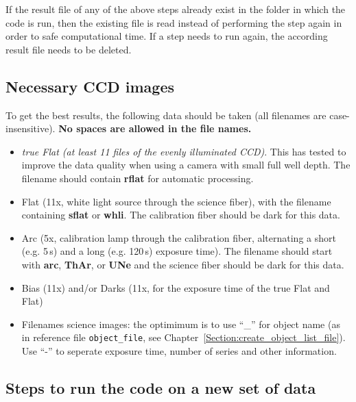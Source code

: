 \documentclass[10pt,a4paper]{article}
\begin{document}
\noindent If the result file of any of the above steps already exist in the folder in which the code is run, then the existing file is read instead of performing the step again in order to safe computational time. If a step needs to run again, the according result file needs to be deleted.

\subsection{Necessary CCD images}
To get the best results, the following data should be taken (all filenames are case-insensitive). \textbf{No spaces are allowed in the file names.}
\begin{itemize}
  \item \textit{true Flat (at least 11 files of the evenly illuminated CCD)}. This has tested to improve the data quality when using a camera with small full well depth. The filename should contain \textbf{rflat} for automatic processing.
  \item Flat (11x, white light source through the science fiber), with the filename containing \textbf{sflat} or \textbf{whli}. The calibration fiber should be dark for this data.
  \item Arc (5x, calibration lamp through the calibration fiber, alternating a short (e.g. 5\,s) and a long (e.g. 120\,s) exposure time). The filename should start with \textbf{arc}, \textbf{ThAr}, or \textbf{UNe} and the science fiber should be dark for this data.
  \item Bias (11x) and/or Darks (11x, for the exposure time of the true Flat and Flat)%
  \item Filenames science images: the optimimum is to use ``\_'' for object name (as in reference file \verb|object_file|, see Chapter~\ref{Section:create_object_list_file}). Use ``-'' to seperate exposure time, number of series and other information.
\end{itemize}

\subsection{Steps to run the code on a new set of data}
\label{section:steps_new_data_set}
\noindent
\end{document}
